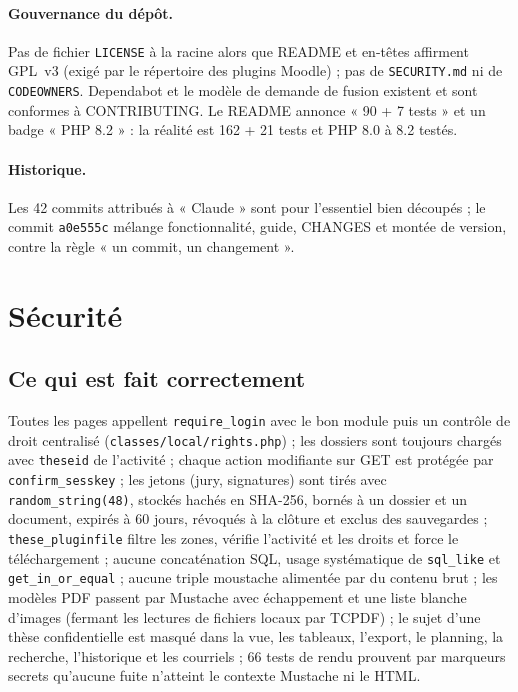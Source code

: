 \documentclass[11pt,a4paper]{article}
\newcommand{\fichier}[1]{\texttt{\small #1}}
\newcommand{\code}[1]{\texttt{#1}}
\begin{document}
\paragraph{Gouvernance du dépôt.}
Pas de fichier \fichier{LICENSE} à la racine alors que README et en-têtes affirment GPL~v3
(exigé par le répertoire des plugins Moodle) ; pas de \fichier{SECURITY.md} ni de
\fichier{CODEOWNERS}. Dependabot et le modèle de demande de fusion existent et sont conformes à
CONTRIBUTING. Le README annonce « 90 + 7 tests » et un badge « PHP 8.2 » : la réalité est 162 +
21 tests et PHP 8.0 à 8.2 testés.

\paragraph{Historique.}
Les 42 commits attribués à « Claude » sont pour l'essentiel bien découpés ; le commit
\code{a0e555c} mélange fonctionnalité, guide, CHANGES et montée de version, contre la règle « un
commit, un changement ».

\section{Sécurité}\label{sec:securite}

\subsection*{Ce qui est fait correctement}

Toutes les pages appellent \code{require\_login} avec le bon module puis un contrôle de droit
centralisé (\fichier{classes/local/rights.php}) ; les dossiers sont toujours chargés avec
\code{theseid} de l'activité ; chaque action modifiante sur GET est protégée par
\code{confirm\_sesskey} ; les jetons (jury, signatures) sont tirés avec \code{random\_string(48)},
stockés hachés en SHA-256, bornés à un dossier et un document, expirés à 60 jours, révoqués à la
clôture et exclus des sauvegardes ; \code{these\_pluginfile} filtre les zones, vérifie l'activité
et les droits et force le téléchargement ; aucune concaténation SQL, usage systématique de
\code{sql\_like} et \code{get\_in\_or\_equal} ; aucune triple moustache alimentée par du contenu
brut ; les modèles PDF passent par Mustache avec échappement et une liste blanche d'images
(fermant les lectures de fichiers locaux par TCPDF) ; le sujet d'une thèse confidentielle est
masqué dans la vue, les tableaux, l'export, le planning, la recherche, l'historique et les
courriels ; 66 tests de rendu prouvent par marqueurs secrets qu'aucune fuite n'atteint le
contexte Mustache ni le HTML.
\end{document}
